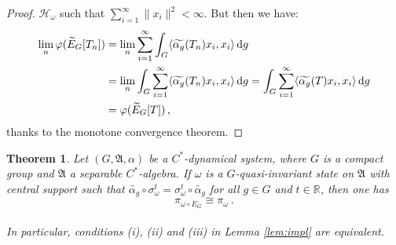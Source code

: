 \documentclass[12pt]{amsart}
\numberwithin{equation}{section}
\def\ch{{\mathcal H}}
\def\ga{{\mathfrak A}} \def\gpa{{\mathfrak a}}
\def\a{\alpha}
\def\s{\sigma} \def\S{\Sigma}
\def\om{\omega} \def\Om{\Omega}
\newtheorem{thm}{Theorem}[section]
\theoremstyle{definition}
\begin{document}
\begin{proof}
$\ch_\om$ such that $\sum_{i=1}^\infty \|x_i\|^2<\infty$. But then we have:
\begin{align*}
\lim_n \varphi(\widetilde E_G[T_n])&=\lim_n\sum_{i=1}^\infty \int_G \langle \widetilde{\a_g}(T_n) x_i, x_i \rangle\,{\rm d}g\\
&=\lim_n \int_G\sum_{i=1}^\infty\langle \widetilde{\a_g}(T_n) x_i, x_i \rangle\,{\rm d}g=\int_G\sum_{i=1}^\infty\langle \widetilde{\a_g}(T) x_i, x_i \rangle\,{\rm d}g\\
&=\varphi(\widetilde E_G[T])\,,
\end{align*}
thanks to the monotone convergence theorem.
\end{proof}

\begin{thm}
\label{thm:main}
Let $(G, \ga, \alpha)$ be a $C^*$-dynamical system, where $G$ is a compact group and
$\ga$ a separable $C^*$-algebra. If $\om$ is a $G$-quasi-invariant state  on  $\ga$ with central support
such that $\widetilde{\a_g}\circ\s_\om^t=\s_\om^t\circ\widetilde{\a_g}$ for all $g\in G$
and $t\in\mathbb{R}$, then one has 
$$\pi_{\om\circ E_G}\cong \pi_\om\ .$$\\
In particular, conditions (i), (ii) and (iii) in Lemma \ref{lem:impl} are equivalent.
\end{thm} 
\end{document}
